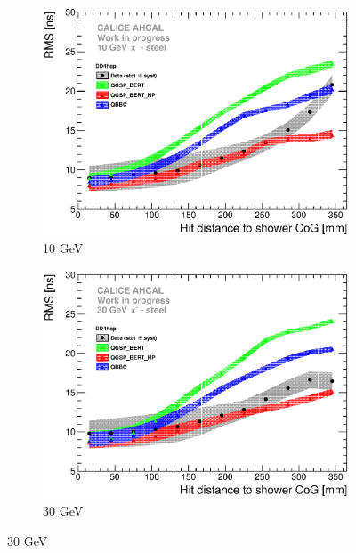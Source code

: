 \begin{figure}[htbp!]
  \begin{subfigure}[t]{0.49\textwidth}
    \centering
    \includegraphics[width=1\textwidth]{../Thesis_Plots/Timing/Pions/Plots/ComparisonToSim/RMS_Radius_10GeV_BL_DD4hep.eps}
    \caption{10 GeV}\label{fig:Radius_BL_RMS_SimData_10GeV_DD4hep}
  \end{subfigure}
  \hfill
  \begin{subfigure}[t]{0.49\textwidth}
    \centering
    \includegraphics[width=1\textwidth]{../Thesis_Plots/Timing/Pions/Plots/ComparisonToSim/RMS_Radius_30GeV_BL_DD4hep.eps}
    \caption{30 GeV}\label{fig:Radius_BL_RMS_SimData_30GeV_DD4hep}
  \end{subfigure}

\end{figure}
